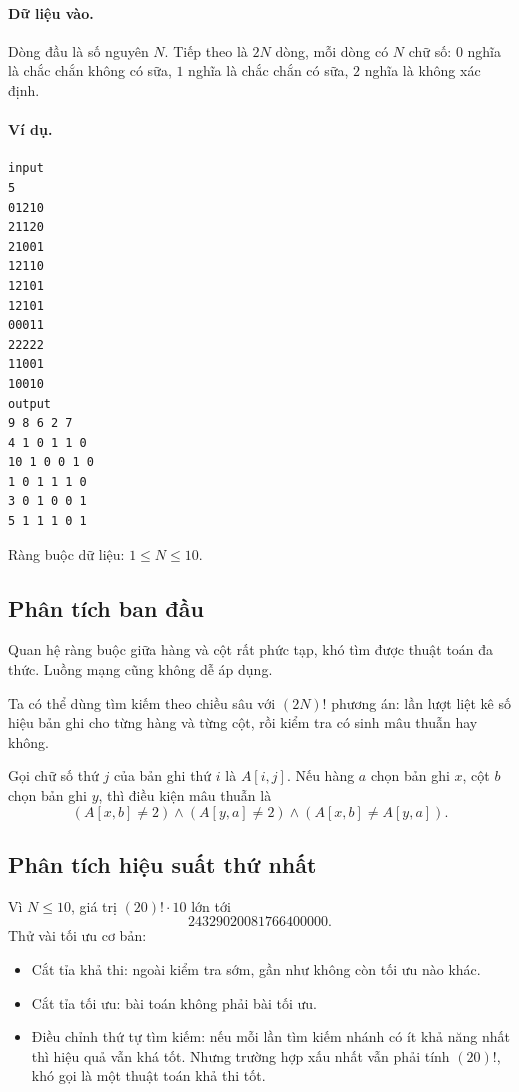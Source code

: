 \documentclass[11pt]{article}
\begin{document}
\paragraph{Dữ liệu vào.}
Dòng đầu là số nguyên $N$. Tiếp theo là $2N$ dòng, mỗi dòng có $N$ chữ số:
$0$ nghĩa là chắc chắn không có sữa, $1$ nghĩa là chắc chắn có sữa, $2$ nghĩa
là không xác định.

\paragraph{Ví dụ.}
\begin{verbatim}
input
5
01210
21120
21001
12110
12101
12101
00011
22222
11001
10010
output
9 8 6 2 7
4 1 0 1 1 0
10 1 0 0 1 0
1 0 1 1 1 0
3 0 1 0 0 1
5 1 1 1 0 1
\end{verbatim}

Ràng buộc dữ liệu: $1\le N\le 10$.

\subsection{Phân tích ban đầu}

Quan hệ ràng buộc giữa hàng và cột rất phức tạp, khó tìm được thuật toán đa
thức. Luồng mạng cũng không dễ áp dụng.

Ta có thể dùng tìm kiếm theo chiều sâu với $(2N)!$ phương án: lần lượt liệt kê
số hiệu bản ghi cho từng hàng và từng cột, rồi kiểm tra có sinh mâu thuẫn hay
không.

Gọi chữ số thứ $j$ của bản ghi thứ $i$ là $A[i,j]$. Nếu hàng $a$ chọn bản ghi
$x$, cột $b$ chọn bản ghi $y$, thì điều kiện mâu thuẫn là
\[
  (A[x,b]\ne 2)\land(A[y,a]\ne 2)\land(A[x,b]\ne A[y,a]).
\]

\subsection{Phân tích hiệu suất thứ nhất}

Vì $N\le 10$, giá trị $(20)!\cdot 10$ lớn tới
\[
  24329020081766400000.
\]
Thử vài tối ưu cơ bản:
\begin{itemize}
  \item Cắt tỉa khả thi: ngoài kiểm tra sớm, gần như không còn tối ưu nào khác.
  \item Cắt tỉa tối ưu: bài toán không phải bài tối ưu.
  \item Điều chỉnh thứ tự tìm kiếm: nếu mỗi lần tìm kiếm nhánh có ít khả năng
  nhất thì hiệu quả vẫn khá tốt. Nhưng trường hợp xấu nhất vẫn phải tính
  $(20)!$, khó gọi là một thuật toán khả thi tốt.
\end{itemize}
\end{document}
